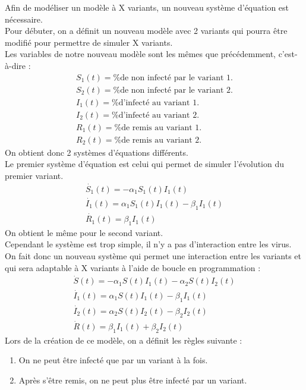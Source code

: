 \documentclass{article}
\begin{document}
Afin de modéliser un modèle à X variants, un nouveau système d'équation est nécessaire.\\
Pour débuter, on a définit un nouveau modèle avec 2 variants qui pourra être modifié pour permettre de simuler X variants.\\
\noindent
Les variables de notre nouveau modèle sont les mêmes que précédemment, c'est-à-dire :
\begin{align}
    S_1(t)= \text{\% de non infecté par le variant 1.} \\
    S_2(t)= \text{\% de non infecté par le variant 2.} \\
    I_1(t)= \text{\% d'infecté au variant 1.} \\
    I_2(t)= \text{\% d'infecté au variant 2.} \\
    R_1(t)= \text{\% de remis au variant 1.} \\
    R_2(t)= \text{\% de remis au variant 2.}
\end{align}
\noindent
On obtient donc 2 systèmes d'équations différents. \\
\noindent
Le premier système d'équation est celui qui permet de simuler l'évolution du premier variant.\\
\begin{align}
    \dot{S_1}(t)= -\alpha_1 S_1(t)I_1(t) \\
    \dot{I_1}(t)= \alpha_1 S_1(t)I_1(t)-\beta_1 I_1(t) \\
    \dot{R_1}(t)= \beta_1 I_1(t)
\end{align}
On obtient le même pour le second variant. \\
Cependant le système est trop simple, il n'y a pas d'interaction entre les virus. \\
On fait donc un nouveau système qui permet une interaction entre les variants et qui sera adaptable à X variants à l'aide de boucle en programmation :
\begin{align}
    \dot{S}(t)= -\alpha_1 S(t)I_1(t) - \alpha_2 S(t)I_2(t) \\
    \dot{I_1}(t)= \alpha_1 S(t)I_1(t)-\beta_1 I_1(t) \\
    \dot{I_2}(t)= \alpha_2 S(t)I_2(t)-\beta_2 I_2(t) \\
    \dot{R}(t)= \beta_1 I_1(t) + \beta_2 I_2(t)
\end{align}
\noindent
Lors de la création de ce modèle, on a définit les règles suivante : \\
\begin{enumerate}
    \item On ne peut être infecté que par un variant à la fois. \\
    \item Après s'être remis, on ne peut plus être infecté par un variant. \\
\end{enumerate}
\end{document}
